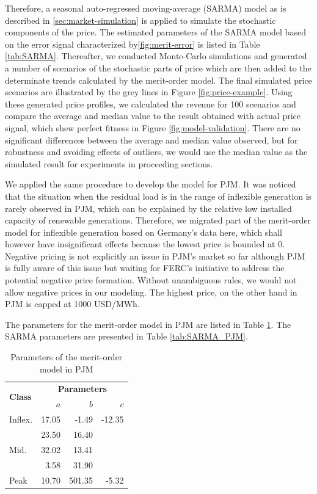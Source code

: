 Therefore, a seasonal auto-regressed moving-average (SARMA) model as is described in \ref{sec:market-simulation} is applied to simulate the stochastic components of the price. The estimated parameters of the SARMA model based on the error signal characterized by\ref{fig:merit-error} is listed in Table \ref{tab:SARMA}. Thereafter, we conducted Monte-Carlo simulations and generated a number of scenarios of the stochastic parts of price which are then added to the determinate trends calculated by the merit-order model. The final simulated price scenarios are illustrated by the grey lines in Figure \ref{fig:price-example}. Using these generated price profiles, we calculated the revenue for 100 scenarios and compare the average and median value to the result obtained with actual price signal, which shew perfect fitness in Figure \ref{fig:model-validation}. There are no significant differences between the average and median value observed, but for robustness and avoiding effects of outliers, we would use the median value as the simulated result for experiments in proceeding sections.

We applied the same procedure to develop the model for PJM. It was noticed that the situation when the residual load is in the range of inflexible generation is rarely observed in PJM, which can be explained by the relative low installed capacity of renewable generations. Therefore, we migrated part of the merit-order model for inflexible generation based on Germany's data here, which shall however have insignificant effects because the lowest price is bounded at 0. Negative pricing is not explicitly an issue in PJM's market so far although PJM is fully aware of this issue but waiting for FERC's initiative to address the potential negative price formation\cite{PJM_price_limit_1}. Without unambiguous rules, we would not allow negative prices in our modeling. The highest price, on the other hand in PJM is capped at 1000 USD/MWh\cite{PJM_price_limit}. 

The parameters for the merit-order model in PJM are listed in Table \ref{tab:merit_pjm}. The SARMA parameters are presented in Table \ref{tab:SARMA_PJM}.

\begin{table}[h!]
	\centering
	\begin{tabular}{l  r r r}
		\hline
		\multirow{2}{*}{\textbf{Class}} & \multicolumn{3}{c}{\textbf{Parameters}}\\
		& $a$ & $b$ & $c$\\
		\hline
		Inflex. & 17.05 & -1.49 & -12.35 \\
		\multirow{3}{*}{Mid.} & 23.50 & 16.40 & \\
		\multirow{3}{*}{} & 32.02 & 13.41 & \\
		\multirow{3}{*}{} & 3.58 & 31.90 & \\
		Peak & 10.70 & 501.35 & -5.32 \\
		\hline
	\end{tabular}
	\caption{Parameters of the merit-order model in PJM}\label{tab:merit_pjm}
\end{table}

